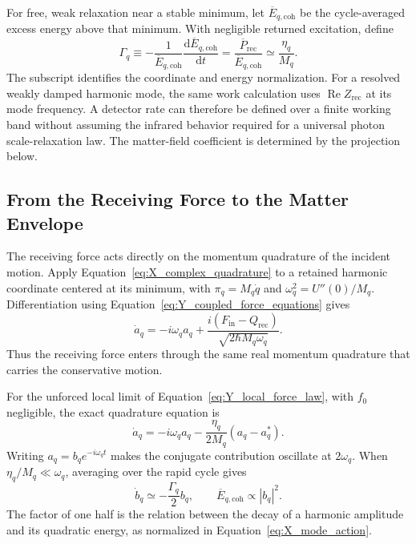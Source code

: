 For free, weak relaxation near a stable minimum, let $\overline E_{q,\mathrm{coh}}$ be the cycle-averaged excess energy above that minimum. With negligible returned excitation, define
\begin{equation}
    \boxed{
    \Gamma_q
    \equiv-\frac{1}{\overline E_{q,\mathrm{coh}}}
    \frac{\mathrm d\overline E_{q,\mathrm{coh}}}{\mathrm dt}
    =\frac{\overline P_{\mathrm{rec}}}{\overline E_{q,\mathrm{coh}}}
    \simeq\frac{\eta_q}{M_q}
    }.
    \label{eq:Y_localized_damping_rate}
\end{equation}
The subscript identifies the coordinate and energy normalization. For a resolved weakly damped harmonic mode, the same work calculation uses $\operatorname{Re}Z_{\mathrm{rec}}$ at its mode frequency. A detector rate can therefore be defined over a finite working band without assuming the infrared behavior required for a universal photon scale-relaxation law. The matter-field coefficient is determined by the projection below.

\subsection{From the Receiving Force to the Matter Envelope}
\label{sec:Y_matter_envelope}

The receiving force acts directly on the momentum quadrature of the incident motion. Apply Equation~\eqref{eq:X_complex_quadrature} to a retained harmonic coordinate centered at its minimum, with $\pi_q=M_q\dot q$ and $\omega_q^2=U''(0)/M_q$. Differentiation using Equation~\eqref{eq:Y_coupled_force_equations} gives
\begin{equation}
    \dot a_q=-i\omega_q a_q
    +\frac{i\left(F_{\mathrm{in}}-Q_{\mathrm{rec}}\right)}
    {\sqrt{2\hbar M_q\omega_q}}.
    \label{eq:Y_forced_complex_amplitude}
\end{equation}
Thus the receiving force enters through the same real momentum quadrature that carries the conservative motion.

For the unforced local limit of Equation~\eqref{eq:Y_local_force_law}, with $f_0$ negligible, the exact quadrature equation is
\begin{equation}
    \dot a_q=-i\omega_q a_q
    -\frac{\eta_q}{2M_q}\left(a_q-a_q^*\right).
    \label{eq:Y_quadrature_damping}
\end{equation}
Writing $a_q=b_qe^{-i\omega_qt}$ makes the conjugate contribution oscillate at $2\omega_q$. When $\eta_q/M_q\ll\omega_q$, averaging over the rapid cycle gives
\begin{equation}
    \dot b_q\simeq-\frac{\Gamma_q}{2}b_q,
    \qquad
    \overline E_{q,\mathrm{coh}}\propto|b_q|^2.
    \label{eq:Y_slow_amplitude_decay}
\end{equation}
The factor of one half is the relation between the decay of a harmonic amplitude and its quadratic energy, as normalized in Equation~\eqref{eq:X_mode_action}.

